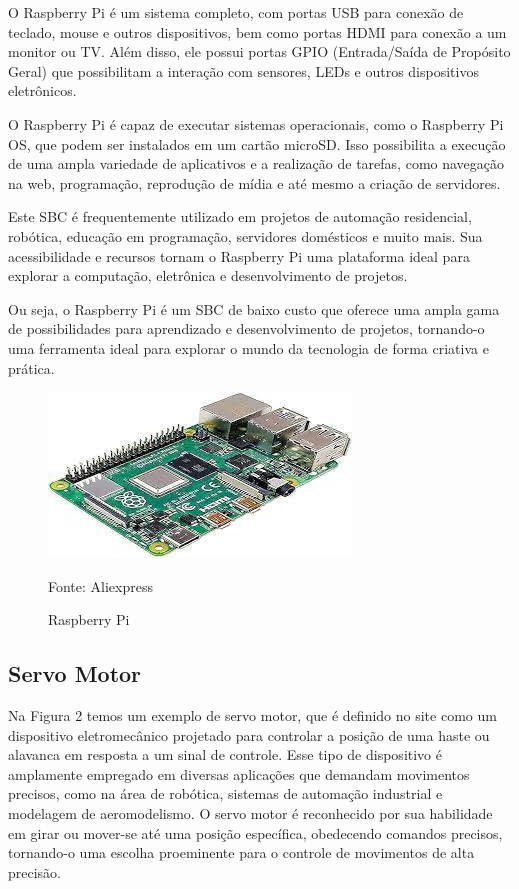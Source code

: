 O Raspberry Pi é um sistema completo, com portas USB para conexão de teclado, mouse e outros dispositivos, bem como portas HDMI para conexão a um monitor ou TV. Além disso, ele possui portas GPIO (Entrada/Saída de Propósito Geral) que possibilitam a interação com sensores, LEDs e outros dispositivos eletrônicos.

O Raspberry Pi é capaz de executar sistemas operacionais, como o Raspberry Pi OS, que podem ser instalados em um cartão microSD. Isso possibilita a execução de uma ampla variedade de aplicativos e a realização de tarefas, como navegação na web, programação, reprodução de mídia e até mesmo a criação de servidores.

Este SBC é frequentemente utilizado em projetos de automação residencial, robótica, educação em programação, servidores domésticos e muito mais. Sua acessibilidade e recursos tornam o Raspberry Pi uma plataforma ideal para explorar a computação, eletrônica e desenvolvimento de projetos.

Ou seja, o Raspberry Pi é um SBC de baixo custo que oferece uma ampla gama de possibilidades para aprendizado e desenvolvimento de projetos, tornando-o uma ferramenta ideal para explorar o mundo da tecnologia de forma criativa e prática.

 \begin{figure}[H]
    \caption{Raspberry Pi}
    \label{fig:raspberryImagem}
    \begin{center}
        
        \includegraphics[scale=1]{Textuais/imagens/raspberry.png}
        
        Fonte:  Aliexpress
    \end{center}
\end{figure}

\subsection{Servo Motor}
Na Figura 2 temos um exemplo de servo motor, que é definido no site  \cite{servomotor} como um dispositivo eletromecânico projetado para controlar a posição de uma haste ou alavanca em resposta a um sinal de controle. Esse tipo de dispositivo é amplamente empregado em diversas aplicações que demandam movimentos precisos, como na área de robótica, sistemas de automação industrial e modelagem de aeromodelismo. O servo motor é reconhecido por sua habilidade em girar ou mover-se até uma posição específica, obedecendo comandos precisos, tornando-o uma escolha proeminente para o controle de movimentos de alta precisão.

